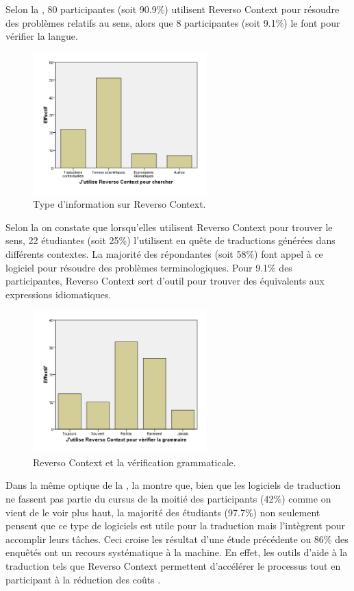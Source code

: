 \documentclass{textolivre}
\begin{document}
Selon la , 80 participantes (soit 90.9\%) utilisent Reverso Context pour résoudre des problèmes relatifs au sens, alors que 8 participantes (soit 9.1\%) le font pour vérifier la langue. 
\begin{figure}[htbp]
\centering
\includegraphics[width=0.6\textwidth]{fig09.png}
\caption{Type d’information sur Reverso Context.}
\label{fig09}
\end{figure}

Selon la  on constate que lorsqu’elles utilisent Reverso Context pour trouver le sens, 22 étudiantes (soit 25\%) l’utilisent en quête de traductions générées dans différents contextes. La majorité des répondantes (soit 58\%) font appel à ce logiciel pour résoudre des problèmes terminologiques. Pour 9.1\% des participantes, Reverso Context sert d’outil pour trouver des équivalents aux expressions idiomatiques.
\begin{figure}[htbp]
\centering
\includegraphics[width=0.6\textwidth]{fig10.png}
\caption{Reverso Context et la vérification grammaticale.}
\label{fig10}
\end{figure}

Dans la même optique de la , la  montre que, bien que les logiciels de traduction ne fassent pas partie du cursus de la moitié des participants (42\%) comme on vient de le voir plus haut, la majorité des étudiants (97.7\%) non seulement pensent que ce type de logiciels est utile pour la traduction mais l’intègrent pour accomplir leurs tâches. Ceci croise les résultat d’une étude précédente \cite{bedjaoui2021} ou 86\% des enquêtés ont un recours systématique à la machine. En effet, les outils d’aide à la traduction tels que Reverso Context permettent d’accélérer le processus tout en participant à la réduction des coûts \cite{kehu2020}.
\end{document}
